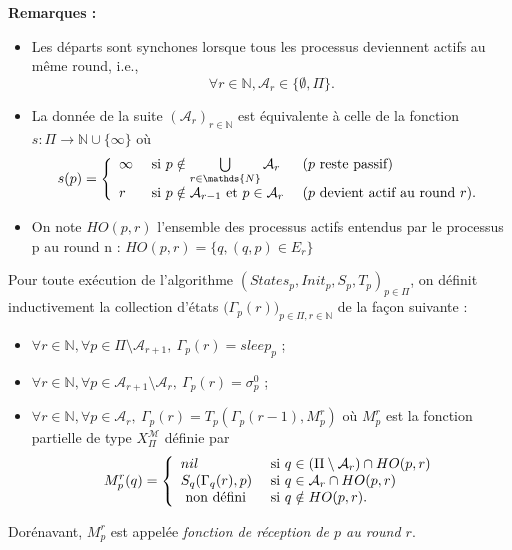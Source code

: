 \documentclass{article}
\begin{document}
\textbf{Remarques :}
\begin{itemize}
	\item Les départs sont synchones lorsque tous les processus deviennent actifs au même round, i.e.,
	$$ \forall r \in \mathds{N}, \mathcal{A}_r \in \{\emptyset, \Pi\}  . $$
	\item La donn\'ee de la suite $(\mathcal{A}_r)_{r \in \mathds{N}}$ est  équivalente \`a celle de la fonction 
	$s : \Pi \rightarrow \mathds{N} \cup \{\infty\}$ où 
	$$ s(p) = \left \{ \begin{array}{l ll}
	                          \infty & \mbox{ si  } p \notin \bigcup\limits_{r \in \mathds{N}}  \mathcal{A}_r &  \mbox { ($p$ reste passif) } \\
	                          r  & \mbox{ si  } p \notin \mathcal{A}_{r-1} \mbox{ et } p \in \mathcal{A}_{r}  & \mbox{ ($p$ devient actif au round $r$)}.
	                          \end{array} \right.$$ 
	\item On note $HO(p,r)$ l'ensemble des processus actifs entendus par le processus p au round n : $HO(p,r) = \{q, (q,p) \in E_r\}$

\end{itemize}

Pour toute  exécution de l'algorithme  $(States_p, Init_p, S_p,T_p)_{p\in \Pi}$, on définit inductivement la collection 
	d'\'etats $ \big( \Gamma_p(r) \big )_{p\in\Pi, r\in \mathds{N}}$ de la fa\c{c}on suivante : 
	\begin{itemize}
		\item $\forall r \in \mathds{N},\forall p \in \Pi \setminus \mathcal{A}_{r+1}, \  \Gamma_p(r) = sleep_p$ ;
		\item $\forall r  \in \mathds{N},\forall p \in \mathcal{A}_{r+1} \setminus \mathcal{A}_r, \ \Gamma_p(r) = \sigma^0_p$ ;
		\item $\forall r  \in \mathds{N},\forall p \in \mathcal{A}_{r} , \  \Gamma_p(r) = T_p (\Gamma_p(r - 1) ,M_p^{r})$
			où $M_p^r$ est la fonction partielle de type $X_\Pi^\mathcal{M}$ définie par 
			$$ M_p^r(q) = \left \{ \begin{array}{l l}
	                         nil  & \mbox{ si  } q \in (\Pi \setminus \mathcal{A}_r  ) \cap  HO(p,r)  \\
	                         S_q (\Gamma_q(r), p)  & \mbox{ si  }   q \in \mathcal{A}_r  \cap  HO(p,r) \\
	                         \mbox{ non d\'efini  } & \mbox{ si  }   q \notin  HO(p,r) .
	                          \end{array} \right.$$ 
	\end{itemize}
Dorénavant, $M_p^r$ est appelée \emph{fonction de réception de $p$ au round $r$}.
\end{document}

